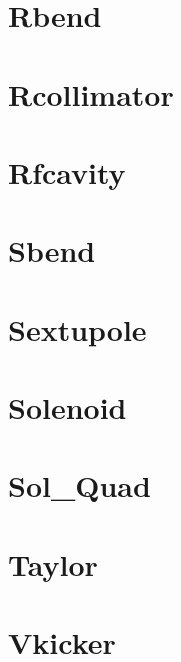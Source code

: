 \section{Rbend}
\label{s:rbend}

\section{Rcollimator}
\label{s:rcol}

\section{Rfcavity}
\label{s:rfcav}

\section{Sbend}
\label{s:sbend}

\section{Sextupole}
\label{s:sex}

\section{Solenoid}
\label{s:sol}

\section{Sol\_Quad}
\label{s:sq}

\section{Taylor}
\label{s:tay}

\section{Vkicker}
\label{s:vk}

